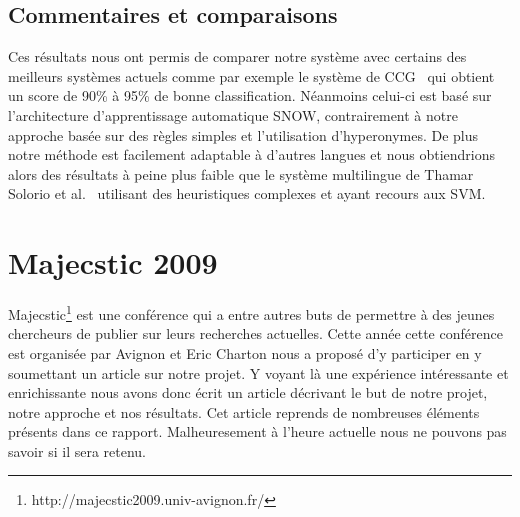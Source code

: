 \documentclass[10pt,a4paper]{article}
\begin{document}
\subsection{Commentaires et comparaisons}
\par Ces résultats nous ont permis de comparer notre système avec certains des meilleurs systèmes actuels
 comme par exemple le système de CCG~\cite{learning:paper} qui obtient un score de 90\% à 95\% de bonne classification. Néanmoins celui-ci est basé sur l'architecture d'apprentissage automatique SNOW, contrairement à notre approche basée sur des règles simples et l'utilisation d'hyperonymes.
De plus notre méthode est facilement adaptable à d'autres langues 
 et nous obtiendrions alors des résultats à peine plus faible que le système multilingue de Thamar Solorio et al.~\cite{solorio:paper} utilisant des heuristiques complexes et ayant recours aux SVM.

\section{Majecstic 2009}
\par Majecstic\footnote{http://majecstic2009.univ-avignon.fr/} est une conférence qui a entre autres buts de permettre à des jeunes chercheurs de publier sur leurs recherches actuelles. Cette année cette conférence est organisée par Avignon et Eric Charton nous a proposé d'y participer en y soumettant un article sur notre projet. Y voyant là une expérience intéressante et enrichissante nous avons donc écrit un article décrivant le but de notre projet, notre approche et nos résultats. Cet article reprends de nombreuses éléments présents dans ce rapport. Malheuresement à l'heure actuelle nous ne pouvons pas savoir si il sera retenu.
\end{document}
